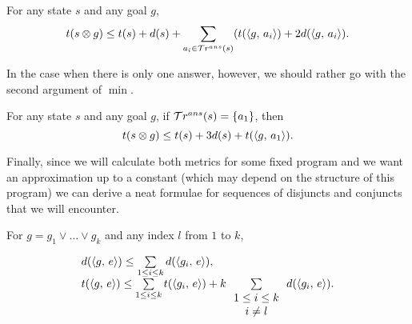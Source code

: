 \begin{corollary}
For any state $s$ and any goal $g$,
\[ t(s \otimes g) \le t(s) + d(s) +  \sum\limits_{a_i \in \mathcal{T}r^{ans}(s)} (t(\langle g ,\, a_i \rangle) + 2 d(\langle g ,\, a_i \rangle). \]
\end{corollary}

In the case when there is only one answer, however, we should rather go with the second argument of $\min$.

\begin{corollary}
For any state $s$ and any goal $g$, if $\mathcal{T}r^{ans}(s) = \{a_1\}$, then
\[ t(s \otimes g) \le t(s) + 3 d(s) + t(\langle g ,\, a_1 \rangle). \]
\end{corollary}

Finally, since we will calculate both metrics for some fixed program and we want an approximation up to a constant (which may depend on the structure of this program) we can derive a neat formulae for sequences of disjuncts and conjuncts that we will encounter.

\begin{lemma}

For $g = g_1 \lor \dots \lor g_k$ and any index $l$ from $1$ to $k$,

\[ \begin{array}{l}
d(\langle g ,\, e \rangle) \le \sum\limits_{1 \le i \le k} d(\langle g_i ,\, e \rangle), \\
t(\langle g ,\, e \rangle) \le \sum\limits_{1 \le i \le k} t(\langle g_i ,\, e \rangle) + k \sum\limits_{\begin{array}{c}1 \le i \le k \\ i \ne l\end{array}} d(\langle g_i ,\, e \rangle).
\end{array} \]

\end{lemma}

